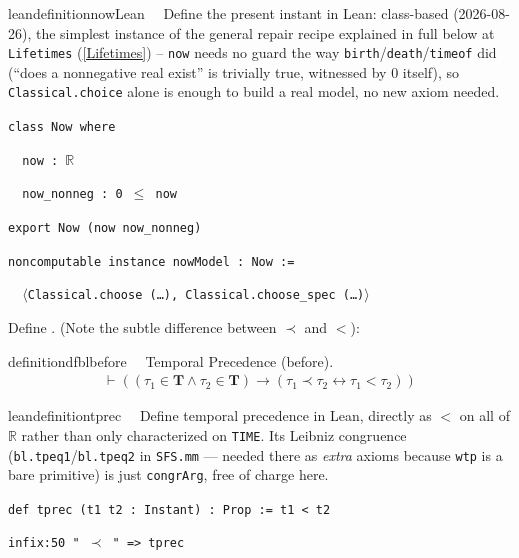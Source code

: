 \begin{restatable}{leandefinition}{nowLean}~~ Define the present instant in Lean:
class-based (2026-08-26), the simplest instance of the general repair recipe explained in full below at
\texttt{Lifetimes} (\ref{Lifetimes}) -- \texttt{now} needs no guard the way \texttt{birth}/\texttt{death}/\texttt{timeof}
did (``does a nonnegative real exist'' is trivially true, witnessed by $0$ itself), so
\texttt{Classical.choice} alone is enough to build a real model, no new axiom needed.

\texttt{\textcolor{leancolor}{class} \textcolor{leanyellow}{Now} \textcolor{leancolor}{where}}

\texttt{~~now : $\mathbb{R}$}

\texttt{~~now\_nonneg : 0 $\le$ now}

\texttt{\textcolor{leancolor}{export} Now (now now\_nonneg)}

\texttt{\textcolor{leancolor}{noncomputable instance} \textcolor{leanyellow}{nowModel} : Now :=}

\texttt{~~$\langle$Classical.choose (\ldots), Classical.choose\_spec (\ldots)$\rangle$}
\label{now}
\end{restatable}


\pn Define .  (Note the subtle difference between $\prec$ and $<$):

\begin{restatable}{definition}{dfblbefore}~~ Temporal Precedence (before).
\begin{align}
\vdash ( ( \tau_1 \in \mathbf{T} \wedge \tau_2 \in \mathbf{T} ) \rightarrow (
    \tau_1 \prec \tau_2 \leftrightarrow \tau_1 < \tau_2 )
    )\label{eq:df-bl.before}\tag{df-bl.before}
\end{align}
\end{restatable}

\begin{restatable}{leandefinition}{tprec}~~ Define temporal precedence in Lean, directly as
$<$ on all of $\mathbb{R}$ rather than only characterized on \texttt{TIME}. Its Leibniz congruence
(\texttt{bl.tpeq1}/\texttt{bl.tpeq2} in \texttt{SFS.mm} --- needed there as \emph{extra} axioms because
\texttt{wtp} is a bare primitive) is just \texttt{congrArg}, free of charge here.

\texttt{\textcolor{leancolor}{def} \textcolor{leanyellow}{tprec} (t1 t2 : Instant) : Prop := t1 < t2}

\texttt{\textcolor{leancolor}{infix:50} " $\prec$ " => tprec}
\label{tprec}
\end{restatable}

